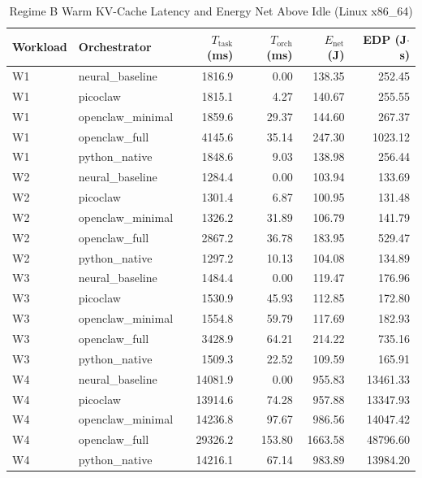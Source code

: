 \begin{table}[t]
\centering\small
\caption{Regime B Warm KV-Cache Latency and Energy Net Above Idle (Linux x86_64)}
\label{tab:linux_warm_cache}
\begin{tabular}{llrrrr}
\toprule
Workload & Orchestrator & $T_{\text{task}}$ (ms) & $T_{\text{orch}}$ (ms) & $E_{\text{net}}$ (J) & EDP (J$\cdot$s) \\
\midrule
W1 & neural\_baseline & 1816.9 & 0.00 & 138.35 & 252.45 \\
W1 & picoclaw & 1815.1 & 4.27 & 140.67 & 255.55 \\
W1 & openclaw\_minimal & 1859.6 & 29.37 & 144.60 & 267.37 \\
W1 & openclaw\_full & 4145.6 & 35.14 & 247.30 & 1023.12 \\
W1 & python\_native & 1848.6 & 9.03 & 138.98 & 256.44 \\
W2 & neural\_baseline & 1284.4 & 0.00 & 103.94 & 133.69 \\
W2 & picoclaw & 1301.4 & 6.87 & 100.95 & 131.48 \\
W2 & openclaw\_minimal & 1326.2 & 31.89 & 106.79 & 141.79 \\
W2 & openclaw\_full & 2867.2 & 36.78 & 183.95 & 529.47 \\
W2 & python\_native & 1297.2 & 10.13 & 104.08 & 134.89 \\
W3 & neural\_baseline & 1484.4 & 0.00 & 119.47 & 176.96 \\
W3 & picoclaw & 1530.9 & 45.93 & 112.85 & 172.80 \\
W3 & openclaw\_minimal & 1554.8 & 59.79 & 117.69 & 182.93 \\
W3 & openclaw\_full & 3428.9 & 64.21 & 214.22 & 735.16 \\
W3 & python\_native & 1509.3 & 22.52 & 109.59 & 165.91 \\
W4 & neural\_baseline & 14081.9 & 0.00 & 955.83 & 13461.33 \\
W4 & picoclaw & 13914.6 & 74.28 & 957.88 & 13347.93 \\
W4 & openclaw\_minimal & 14236.8 & 97.67 & 986.56 & 14047.42 \\
W4 & openclaw\_full & 29326.2 & 153.80 & 1663.58 & 48796.60 \\
W4 & python\_native & 14216.1 & 67.14 & 983.89 & 13984.20 \\
\bottomrule
\end{tabular}
\end{table}
